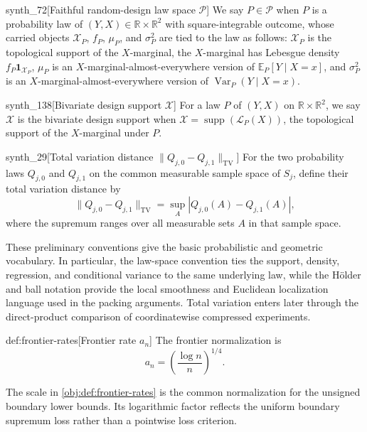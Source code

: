 \begin{definitionv}{synth_72}[Faithful random-design law space \(\mathcal P\)]
We say \(P\in\mathcal P\) when \(P\) is a probability law of \((Y,X)\in\mathbb R\times\mathbb R^2\) with square-integrable outcome, whose carried objects \(\mathcal X_P\), \(f_P\), \(\mu_P\), and \(\sigma_P^2\) are tied to the law as follows: \(\mathcal X_P\) is the topological support of the \(X\)-marginal, the \(X\)-marginal has Lebesgue density \(f_P\mathbf 1_{\mathcal X_P}\), \(\mu_P\) is an \(X\)-marginal-almost-everywhere version of \(\mathbb E_P[Y\mid X=x]\), and \(\sigma_P^2\) is an \(X\)-marginal-almost-everywhere version of \(\operatorname{Var}_P(Y\mid X=x)\).
\end{definitionv}

\begin{definitionv}{synth_138}[Bivariate design support \(\mathcal X\)]
For a law \(P\) of \((Y,X)\) on \(\mathbb R\times\mathbb R^2\), we say \(\mathcal X\) is the bivariate design support when \(\mathcal X=\operatorname{supp}(\mathcal L_P(X))\), the topological support of the \(X\)-marginal under \(P\).
\end{definitionv}

\begin{definitionv}{synth_29}[Total variation distance $\lVert Q_{j,0}-Q_{j,1}\rVert_{\mathrm{TV}}$]
For the two probability laws $Q_{j,0}$ and $Q_{j,1}$ on the common measurable sample space of $S_j$, define their total variation distance by \[\lVert Q_{j,0}-Q_{j,1}\rVert_{\mathrm{TV}}=\sup_{A}\left|Q_{j,0}(A)-Q_{j,1}(A)\right|,\] where the supremum ranges over all measurable sets $A$ in that sample space.
\end{definitionv}

These preliminary conventions give the basic probabilistic and geometric vocabulary. In particular, the law-space convention ties the support, density, regression, and conditional variance to the same underlying law, while the Hölder and ball notation provide the local smoothness and Euclidean localization language used in the packing arguments. Total variation enters later through the direct-product comparison of coordinatewise compressed experiments.

\begin{definitionv}{def:frontier-rates}[Frontier rate $a_n$]
The frontier normalization is
\[
a_n=\left(\frac{\log n}{n}\right)^{1/4}.
\]
\end{definitionv}

The scale in \cref{obj:def:frontier-rates} is the common normalization for the unsigned boundary lower bounds. Its logarithmic factor reflects the uniform boundary supremum loss rather than a pointwise loss criterion.


